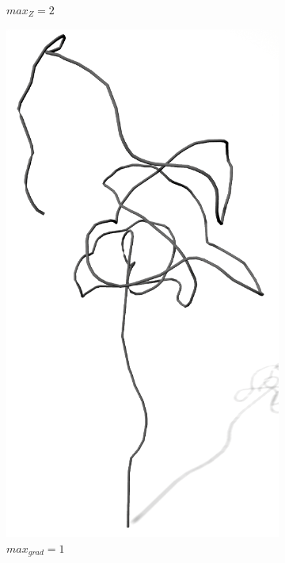 \begin{figure} [hbtp]
\begin{subfigure}[t]{.45\textwidth}
		\caption{$max_Z = 2$}
		\label{subfig:SCA_Sonst_Zweigtiefe}
	\end{subfigure}
	\begin{subfigure}[t]{.45\textwidth}
		\centering
		\includegraphics[height=.21\textheight]{images/SCA_Sonst_Grad.png}
		\caption{$max_{grad} = 1$}
		\label{subfig:SCA_Sonst_Grad1}
	\end{subfigure}
	\begin{subfigure}[t]{.45\textwidth}

\end{subfigure}
\end{figure}
